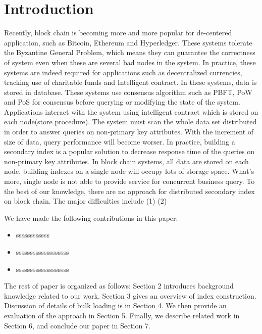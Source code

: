 \section{Introduction}
\vspace{-0.2cm}
Recently, block chain is becoming more and more popular
for de-centered application, such as Bitcoin, Ethereum and
Hyperledger. These systems tolerate the Byzantine General
Problem, which means they can guarantee the correctness
of system even when these are several bad nodes in the system. In practice, these systems are indeed required for applications such as decentralized currencies, tracking use of
charitable funds and Intelligent contract.
In these systems, data is stored in database. These systems use consensus algorithm such as PBFT, PoW and PoS
for consensus before querying or modifying the state of the
system. Applications interact with the system using intelligent contract which is stored on each node(store procedure).
The system must scan the whole data set distributed in order to answer queries on non-primary key attributes. With
the increment of size of data, query performance will become worser. In practice, building a secondary index is a
popular solution to decrease response time of the queries
on non-primary key attributes. In block chain systems, all
data are stored on each node, building indexes on a single
node will occupy lots of storage space. What’s more, single
node is not able to provide service for concurrent business
query. To the best of our knowledge, there are no approach
for distributed secondary index on block chain. The major
difficulties include (1) (2)

We have made the following contributions in this paper:
\begin{itemize}
\renewcommand{\labelitemi}{$\bullet$}
\item
 ssssssssssss
\item
  sssssssssssssssssss
\item
 sssssssssssssssssss
\end{itemize}

The rest of paper is organized as follows: Section 2 introduces background knowledge related to our work. Section 3 gives an overview of index construction. Discussion of details of bulk loading is in Section 4. We then provide an evaluation of the approach in Section 5. Finally, we describe related work in Section 6, and conclude our paper in Section 7.

\vspace{-0.2cm}
